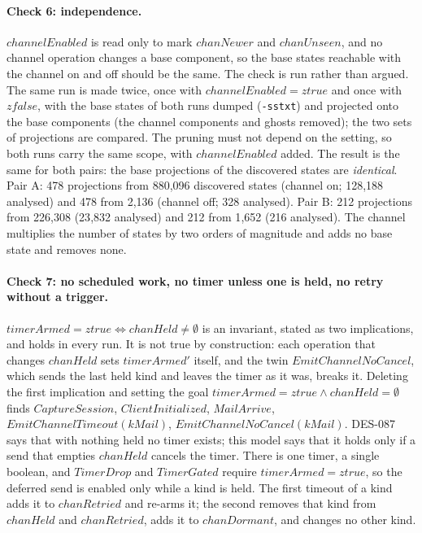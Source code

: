 \documentclass[a4paper,10pt,fleqn]{article}
\begin{document}
\paragraph{Check 6: independence.}  $channelEnabled$ is read only to mark
$chanNewer$ and $chanUnseen$, and no channel operation changes a base
component, so the base states reachable with the channel on and off should be
the same.  The check is run rather than argued.  The same run is made twice,
once with $channelEnabled = ztrue$ and once with $zfalse$, with the base
states of both runs dumped (\texttt{-sstxt}) and projected onto the base
components (the channel components and ghosts removed); the two sets of
projections are compared.  The pruning must not depend on the setting, so
both runs carry the same scope, with $channelEnabled$ added.  The result is
the same for both pairs: the base projections of the discovered states are
\emph{identical}.  Pair A: 478 projections from 880{,}096 discovered states
(channel on; 128{,}188 analysed) and 478 from 2{,}136 (channel off; 328
analysed).  Pair B: 212 projections from 226{,}308 (23{,}832 analysed) and
212 from 1{,}652 (216 analysed).  The channel multiplies the number of
states by two orders of magnitude and adds no base state and removes none.

\paragraph{Check 7: no scheduled work, no timer unless one is held, no
retry without a trigger.}
$timerArmed = ztrue \iff chanHeld \neq \emptyset$ is an invariant, stated
as two implications, and holds in every run.  It is not true by
construction: each operation that changes $chanHeld$ sets $timerArmed'$
itself, and the twin $EmitChannelNoCancel$, which sends the last held kind
and leaves the timer as it was, breaks it.  Deleting the first implication
and setting the goal $timerArmed = ztrue \land chanHeld = \emptyset$ finds
$CaptureSession$, $ClientInitialized$, $MailArrive$,
$EmitChannelTimeout(kMail)$, $EmitChannelNoCancel(kMail)$.  DES-087 says
that with nothing held no timer exists; this model says that it holds
only if a send that empties $chanHeld$ cancels the timer.  There is one
timer, a single boolean, and $TimerDrop$ and $TimerGated$ require
$timerArmed = ztrue$, so the deferred send is enabled only while a kind is
held.  The first timeout of a kind adds it to $chanRetried$ and re-arms
it; the second removes that kind from $chanHeld$ and $chanRetried$, adds it
to $chanDormant$, and changes no other kind.
\end{document}
